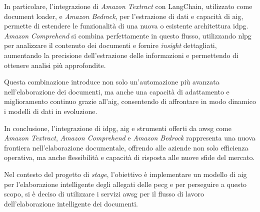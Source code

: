 In particolare, l'integrazione di \emph{Amazon Textract} con LangChain, utilizzato come document loader, e \emph{Amazon Bedrock}, per l'estrazione di dati e capacità di \gls{aig}, permette di estendere le funzionalità di una nuova o esistente architettura \gls{idpg}. \emph{Amazon Comprehend} si combina perfettamente in questo flusso, utilizzando \gls{nlpg} per analizzare il contenuto dei documenti e fornire \emph{insight} dettagliati, aumentando la precisione dell'estrazione delle informazioni e permettendo di ottenere analisi più approfondite.

Questa combinazione introduce non solo un'automazione più avanzata nell'elaborazione dei documenti, ma anche una capacità di adattamento e miglioramento continuo grazie all'\gls{aig}, consentendo di affrontare in modo dinamico i modelli di dati in evoluzione.

In conclusione, l'integrazione di \gls{idpg}, \gls{aig} e strumenti offerti da \gls{awsg} come \emph{Amazon Textract}, \emph{Amazon Comprehend} e \emph{Amazon Bedrock} rappresenta una nuova frontiera nell'elaborazione documentale, offrendo alle aziende non solo efficienza operativa, ma anche flessibilità e capacità di risposta alle nuove sfide del mercato.

Nel contesto del progetto di \emph{stage}, l'obiettivo è implementare un modello di \gls{aig} per l'elaborazione intelligente degli allegati delle \gls{pecg} e per perseguire a questo scopo, si è deciso di utilizzare i servizi \gls{awsg} per il flusso di lavoro dell'elaborazione intelligente dei documenti.


%
%
%
